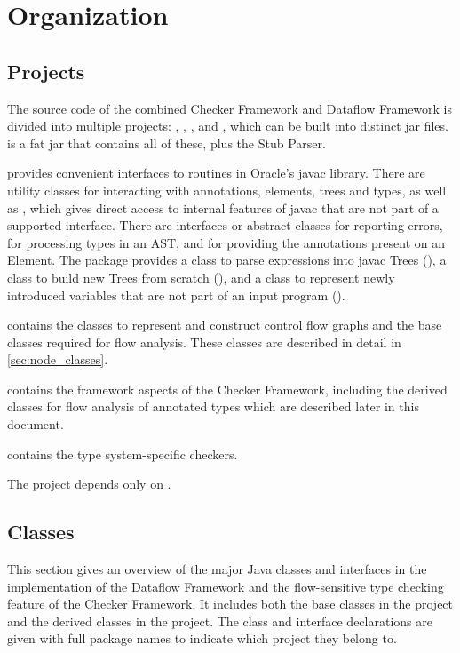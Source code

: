 \section{Organization}

\subsection{Projects}

The source code of the combined Checker Framework and Dataflow
Framework is divided into multiple projects: ,
, , and ,
which can be built into distinct jar files.   is a fat
jar that contains all of these, plus the Stub Parser.

 provides convenient interfaces to routines in
Oracle's javac library.  There are utility classes for interacting
with annotations, elements, trees and types, as well as
, which gives direct access to internal features
of javac that are not part of a supported interface.  There are
interfaces or abstract classes for reporting errors, for processing
types in an AST, and for providing the annotations present on an
Element.
The  package provides a
class to parse expressions into javac Trees (), a
class to build new Trees from  scratch (), and a
class to represent newly introduced variables that are not part of an
input program ().

 contains the classes to represent and construct
control flow graphs and the base classes required for flow analysis.
These classes are described in detail in \autoref{sec:node_classes}.

 contains the framework aspects of the Checker
Framework, including the derived classes for flow analysis of
annotated types which are described later in this document.

 contains the type system-specific checkers.

The  project depends only on .


\subsection{Classes}

This section gives an overview of the major Java classes and
interfaces in the implementation of the Dataflow Framework and the
flow-sensitive type checking feature of the Checker Framework.  It
includes both the base classes in the  project and the
derived classes in the  project.  The class and
interface declarations are given with full package names to indicate
which project they belong to.

